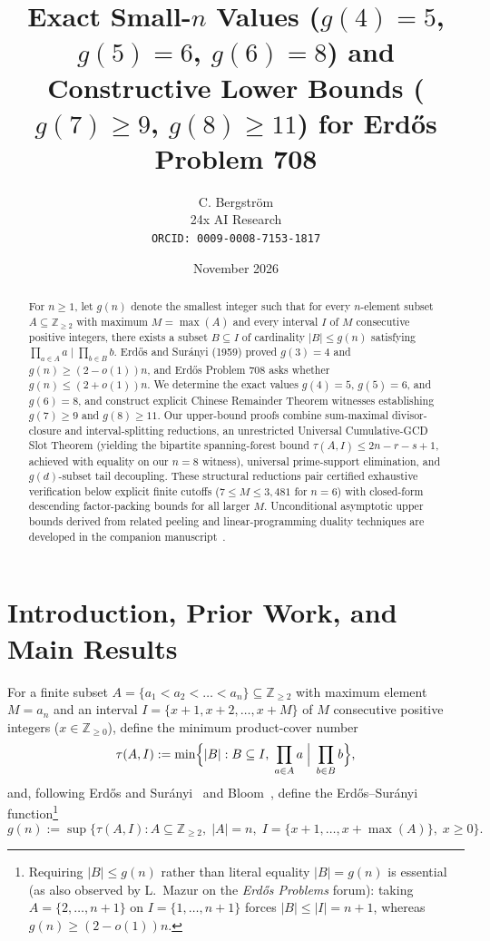 \documentclass[11pt]{article}
\title{Exact Small-$n$ Values ($g(4) = 5$, $g(5) = 6$, $g(6) = 8$) and\\ Constructive Lower Bounds ($g(7) \ge 9$, $g(8) \ge 11$) for Erd\H{o}s Problem 708}
\author{C. Bergstr\"om \\ 24x AI Research \\ \texttt{ORCID: 0009-0008-7153-1817}}
\date{November 2026}
\begin{document}
\maketitle

\begin{abstract}
For $n \ge 1$, let $g(n)$ denote the smallest integer such that for every $n$-element subset $A \subseteq \mathbb{Z}_{\ge 2}$ with maximum $M = \max(A)$ and every interval $I$ of $M$ consecutive positive integers, there exists a subset $B \subseteq I$ of cardinality $|B| \le g(n)$ satisfying $\prod_{a \in A} a \mid \prod_{b \in B} b$. Erd\H{o}s and Sur\'anyi (1959) proved $g(3) = 4$ and $g(n) \ge (2 - o(1)) n$, and Erd\H{o}s Problem 708 asks whether $g(n) \le (2 + o(1)) n$. We determine the exact values $g(4) = 5$, $g(5) = 6$, and $g(6) = 8$, and construct explicit Chinese Remainder Theorem witnesses establishing $g(7) \ge 9$ and $g(8) \ge 11$. Our upper-bound proofs combine sum-maximal divisor-closure and interval-splitting reductions, an unrestricted Universal Cumulative-GCD Slot Theorem (yielding the bipartite spanning-forest bound $\tau(A, I) \le 2n - r - s + 1$, achieved with equality on our $n = 8$ witness), universal prime-support elimination, and $g(d)$-subset tail decoupling. These structural reductions pair certified exhaustive verification below explicit finite cutoffs ($7 \le M \le 3{,}481$ for $n = 6$) with closed-form descending factor-packing bounds for all larger $M$. Unconditional asymptotic upper bounds derived from related peeling and linear-programming duality techniques are developed in the companion manuscript~\cite{bergstrom26asymptotic}.
\end{abstract}

\section{Introduction, Prior Work, and Main Results}

For a finite subset $A = \{a_1 < a_2 < \dots < a_n\} \subseteq \mathbb{Z}_{\ge 2}$ with maximum element $M = a_n$ and an interval $I = \{x + 1, x + 2, \dots, x + M\}$ of $M$ consecutive positive integers ($x \in \mathbb{Z}_{\ge 0}$), define the minimum product-cover number
\[
\tau(A, I) := \min\Bigl\{ |B| : B \subseteq I, \; \prod_{a \in A} a \;\Big|\; \prod_{b \in B} b \Bigr\},
\]
and, following Erd\H{o}s and Sur\'anyi~\cite{erdossuranyi59} and Bloom~\cite{bloom708}, define the Erd\H{o}s--Sur\'anyi function\footnote{Requiring $|B| \le g(n)$ rather than literal equality $|B| = g(n)$ is essential (as also observed by L.~Mazur on the \emph{Erd\H{o}s Problems} forum): taking $A = \{2, \dots, n + 1\}$ on $I = \{1, \dots, n + 1\}$ forces $|B| \le |I| = n + 1$, whereas $g(n) \ge (2 - o(1)) n$.}
\[
g(n) := \sup\bigl\{ \tau(A, I) : A \subseteq \mathbb{Z}_{\ge 2}, \; |A| = n, \; I = \{x + 1, \dots, x + \max(A)\}, \; x \ge 0 \bigr\}.
\]
\end{document}
